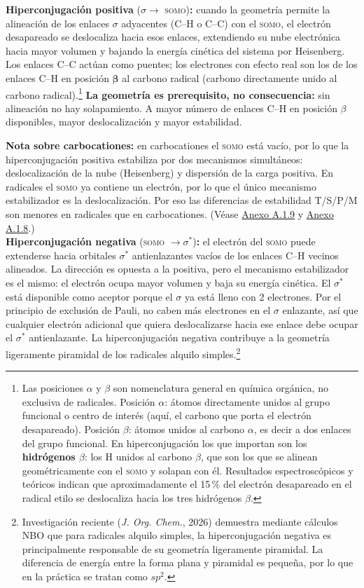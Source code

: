 \textbf{Hiperconjugación positiva} ($\sigma \rightarrow$ \textsc{somo})\textbf{:} cuando la
geometría permite la alineación de los enlaces $\sigma$ adyacentes (C--H o C--C) con el
\textsc{somo}, el electrón desapareado se deslocaliza hacia esos enlaces, extendiendo su nube
electrónica hacia mayor volumen y bajando la energía cinética del sistema por Heisenberg. Los
enlaces C--C actúan como puentes; los electrones con efecto real son los de los enlaces C--H en
posición $\boldsymbol{\beta}$ al carbono radical (carbono directamente unido al carbono
radical).\footnote{Las posiciones $\alpha$ y $\beta$ son nomenclatura general en química orgánica, no
exclusiva de radicales. Posición $\alpha$: átomos directamente unidos al grupo funcional o centro
de interés (aquí, el carbono que porta el electrón desapareado). Posición $\beta$: átomos unidos
al carbono $\alpha$, es decir a dos enlaces del grupo funcional. En hiperconjugación los que
importan son los \textbf{hidrógenos $\beta$}: los H unidos al carbono $\beta$, que son los que se
alinean geométricamente con el \textsc{somo} y solapan con él. Resultados espectroscópicos y
teóricos indican que aproximadamente el 15\,\% del electrón desapareado en el radical etilo se
deslocaliza hacia los tres hidrógenos $\beta$.} \textbf{La geometría es prerequisito, no consecuencia:} sin alineación
no hay solapamiento. A mayor número de enlaces C--H en posición $\beta$ disponibles, mayor
deslocalización y mayor estabilidad.

\textbf{Nota sobre carbocationes:} en carbocationes el \textsc{somo} está vacío, por lo que la
hiperconjugación positiva estabiliza por dos mecanismos simultáneos: deslocalización de la nube
(Heisenberg) y dispersión de la carga positiva. En radicales el \textsc{somo} ya contiene un
electrón, por lo que el único mecanismo estabilizador es la deslocalización. Por eso las diferencias
de estabilidad T/S/P/M son menores en radicales que en carbocationes. 
(Véase \hyperref[sec:anexo:tom:somo]{Anexo A.1.9} y \hyperref[sec:anexo:tom:heisenberg]{Anexo A.1.8}.)\\

\textbf{Hiperconjugación negativa} (\textsc{somo} $\rightarrow \sigma^*$)\textbf{:} el electrón
del \textsc{somo} puede extenderse hacia orbitales $\sigma^*$ antienlazantes vacíos de los enlaces
C--H vecinos alineados. La dirección es opuesta a la positiva, pero el mecanismo estabilizador es
el mismo: el electrón ocupa mayor volumen y baja su energía cinética. El $\sigma^*$ está disponible como aceptor porque el $\sigma$ ya está lleno con 
2 electrones. Por el principio de exclusión de Pauli, no caben más electrones en el 
$\sigma$ enlazante, así que cualquier electrón adicional que quiera deslocalizarse 
hacia ese enlace debe ocupar el $\sigma^*$ antienlazante. La hiperconjugación negativa contribuye a la
geometría ligeramente piramidal de los radicales alquilo simples.\footnote{Investigación reciente
(\textit{J. Org. Chem.}, 2026) demuestra mediante cálculos NBO que para radicales alquilo simples,
la hiperconjugación negativa es principalmente responsable de su geometría ligeramente piramidal.
La diferencia de energía entre la forma plana y piramidal es pequeña, por lo que en la práctica se
tratan como $sp^2$.} \\

